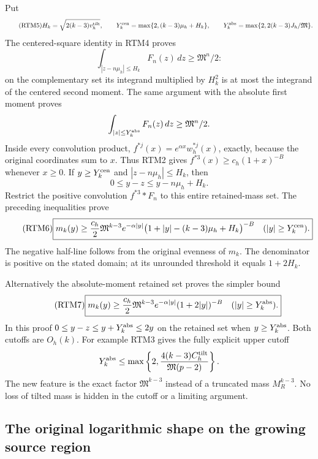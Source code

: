 Put
\begin{equation}\tag{RTM5}
 H_k=\sqrt{2(k-3)v_h^{\rm tilt}},\qquad
 Y_k^{\rm cen}=\max\{2,(k-3)\mu_h+H_k\},\qquad
 Y_k^{\rm abs}=\max\{2,2(k-3)J_h/\mathfrak M\}.
\end{equation}
The centered-square identity in RTM4 proves
\[
 \int_{|z-n\mu_h|\le H_k}F_n(z)\,dz\ge\mathfrak M^n/2:
\]
on the complementary set its integrand multiplied by $H_k^2$ is at
most the integrand of the centered second moment.  The same argument
with the absolute first moment proves
\[
 \int_{|z|\le Y_k^{\rm abs}}F_n(z)\,dz\ge\mathfrak M^n/2.
\]
Inside every convolution product,
$f^{*j}(x)=e^{\alpha x}w_h^{*j}(x)$, exactly, because the original
coordinates sum to $x$.  Thus RTM2 gives
$f^{*3}(x)\ge c_h(1+x)^{-B}$ whenever $x\ge0$.
If $y\ge Y_k^{\rm cen}$ and $|z-n\mu_h|\le H_k$, then
\[
 0\le y-z\le y-n\mu_h+H_k.
\]
Restrict the positive convolution $f^{*3}*F_n$ to this entire
retained-mass set.  The preceding inequalities prove
\begin{equation}\tag{RTM6}
 \boxed{m_k(y)\ge\frac{c_h}{2}\mathfrak M^{k-3}e^{-\alpha|y|}
 \bigl(1+|y|-(k-3)\mu_h+H_k\bigr)^{-B}
 \quad(|y|\ge Y_k^{\rm cen}).}
\end{equation}
The negative half-line follows from the original evenness of $m_k$.
The denominator is positive on the stated domain; at its unrounded
threshold it equals $1+2H_k$.

Alternatively the absolute-moment retained set proves the simpler bound
\begin{equation}\tag{RTM7}
 \boxed{m_k(y)\ge\frac{c_h}{2}\mathfrak M^{k-3}e^{-\alpha|y|}
 (1+2|y|)^{-B}\quad(|y|\ge Y_k^{\rm abs}).}
\end{equation}
In this proof $0\le y-z\le y+Y_k^{\rm abs}\le2y$ on the
retained set when $y\ge Y_k^{\rm abs}$.  Both cutoffs are $O_h(k)$.
For example RTM3 gives the fully explicit upper cutoff
\[
 Y_k^{\rm abs}\le
 \max\left\{2,\frac{4(k-3)C_h^{\rm tilt}}
                         {\mathfrak M(p-2)}\right\}.
\]
The new feature is the exact factor $\mathfrak M^{k-3}$ instead of
a truncated mass $M_R^{k-3}$.  No loss of tilted mass is hidden in
the cutoff or a limiting argument.

\subsection{The original logarithmic shape on the growing source region}


